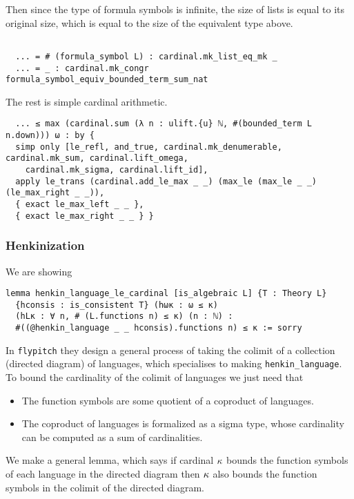 Then since the type of formula symbols is infinite,
the size of lists is equal to its original size,
which is equal to the size of the equivalent type above.

\begin{lstlisting}

  ... = # (formula_symbol L) : cardinal.mk_list_eq_mk _
  ... = _ : cardinal.mk_congr formula_symbol_equiv_bounded_term_sum_nat \end{lstlisting}

The rest is simple cardinal arithmetic.

\begin{lstlisting}
  ... ≤ max (cardinal.sum (λ n : ulift.{u} ℕ, #(bounded_term L n.down))) ω : by {
  simp only [le_refl, and_true, cardinal.mk_denumerable, cardinal.mk_sum, cardinal.lift_omega,
    cardinal.mk_sigma, cardinal.lift_id],
  apply le_trans (cardinal.add_le_max _ _) (max_le (max_le _ _) (le_max_right _ _)),
  { exact le_max_left _ _ },
  { exact le_max_right _ _ } } \end{lstlisting}

\subsubsection{Henkinization}


We are showing

\begin{lstlisting}
lemma henkin_language_le_cardinal [is_algebraic L] {T : Theory L}
  {hconsis : is_consistent T} (hωκ : ω ≤ κ)
  (hLκ : ∀ n, # (L.functions n) ≤ κ) (n : ℕ) :
  #((@henkin_language _ _ hconsis).functions n) ≤ κ := sorry \end{lstlisting}

In \texttt{flypitch} they design a general process of taking the colimit
of a collection (directed diagram) of languages,
which specialises to making \texttt{henkin\_language}.
To bound the cardinality of the colimit of languages we just need that
\begin{itemize}
  \item The function symbols are some quotient of a coproduct of languages.
  \item The coproduct of languages is formalized as a sigma type,
        whose cardinality can be computed as a sum of cardinalities.
\end{itemize}

We make a general lemma,
which says if cardinal $\kappa$ bounds the function symbols of each language
in the directed diagram then $\kappa$ also bounds
the function symbols in the colimit of the directed diagram.

